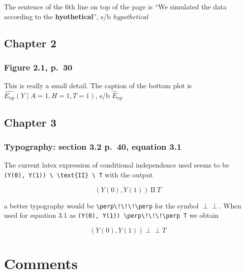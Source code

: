\documentclass[
]{book}
\theoremstyle{definition}
\theoremstyle{definition}
\theoremstyle{definition}
\theoremstyle{definition}
\theoremstyle{remark}
\begin{document}
The sentence of the 6th line on top of the page
is ``We simulated the data according to the \textbf{hyothetical}'', s/b \emph{hypothetical}

\hypertarget{chapter-2}{%
\section*{Chapter 2}\label{chapter-2}}

\hypertarget{figure-2.1-p.-30}{%
\subsection*{Figure 2.1, p.~30}\label{figure-2.1-p.-30}}

This is really a small detail. The caption of the bottom plot is
\(\hat{E_{np}}(Y \mid A= 1, H =1, T = 1)\), s/b \(\hat{E}_{np}\)

\hypertarget{chapter-3}{%
\section*{Chapter 3}\label{chapter-3}}

\hypertarget{typography-section-3.2-p.-40-equation-3.1}{%
\subsection*{Typography: section 3.2 p.~40, equation 3.1}\label{typography-section-3.2-p.-40-equation-3.1}}

The current latex expression of conditional independence used seems to be
\texttt{(Y(0),\ Y(1))\ \textbackslash{}\ \textbackslash{}text\{II\}\ \textbackslash{}\ T} with the output

\[
(Y(0), Y(1)) \ \text{II} \ T
\]

a better typography would be \texttt{\textbackslash{}perp\textbackslash{}!\textbackslash{}!\textbackslash{}!\textbackslash{}perp} for the symbol \(\perp\!\!\!\perp\).
When used for equation 3.1 as \texttt{(Y(0),\ Y(1))\ \textbackslash{}perp\textbackslash{}!\textbackslash{}!\textbackslash{}!\textbackslash{}perp\ T} we obtain

\[
(Y(0), Y(1)) \perp\!\!\!\perp T
\]

\hypertarget{comments}{%
\chapter*{Comments}\label{comments}}
\end{document}
